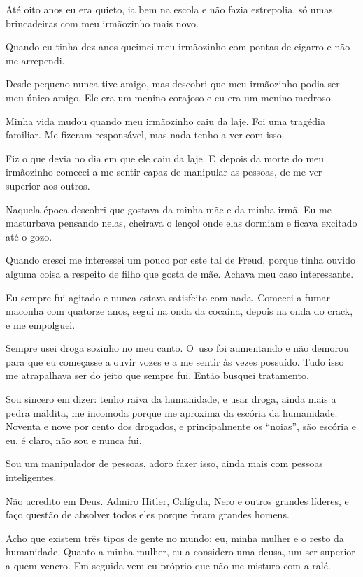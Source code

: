  

Até oito anos eu era quieto, ia bem na escola e não fazia estrepolia, só
umas brincadeiras com meu irmãozinho mais novo.

Quando eu tinha dez anos queimei meu irmãozinho com pontas de cigarro e
não me arrependi.

Desde pequeno nunca tive amigo, mas descobri que meu irmãozinho podia
ser meu único amigo. Ele era um menino corajoso e eu era um menino
medroso.

Minha vida mudou quando meu irmãozinho caiu da laje. Foi uma tragédia
familiar. Me fizeram responsável, mas nada tenho a ver com isso.

Fiz o que devia no dia em que ele caiu da laje. E~depois da morte do meu
irmãozinho comecei a me sentir capaz de manipular as pessoas, de me ver
superior aos outros.

Naquela época descobri que gostava da minha mãe e da minha irmã. Eu me
masturbava pensando nelas, cheirava o lençol onde elas dormiam e ficava
excitado até o gozo.

Quando cresci me interessei um pouco por este tal de Freud, porque tinha
ouvido alguma coisa a respeito de filho que gosta de mãe. Achava meu
caso interessante.

Eu sempre fui agitado e nunca estava satisfeito com nada. Comecei a
fumar maconha com quatorze anos, segui na onda da cocaína, depois na
onda do crack, e me empolguei.

\asterisc{}

Sempre usei droga sozinho no meu canto. O~uso foi aumentando e não
demorou para que eu começasse a ouvir vozes e a me sentir às vezes
possuído. Tudo isso me atrapalhava ser do jeito que sempre fui. Então
busquei tratamento.

Sou sincero em dizer: tenho raiva da humanidade, e usar droga, ainda
mais a pedra maldita, me incomoda porque me aproxima da escória da
humanidade. Noventa e nove por cento dos drogados, e principalmente os
``noias'', são escória e eu, é claro, não sou e nunca fui.

Sou um manipulador de pessoas, adoro fazer isso, ainda mais com pessoas
inteligentes.

Não acredito em Deus. Admiro Hitler, Calígula, Nero e outros grandes
líderes, e faço questão de absolver todos eles porque foram grandes
homens.

Acho que existem três tipos de gente no mundo: eu, minha mulher e o
resto da humanidade. Quanto a minha mulher, eu a considero uma deusa, um
ser superior a quem venero. Em seguida vem eu próprio que não me misturo
com a ralé.

